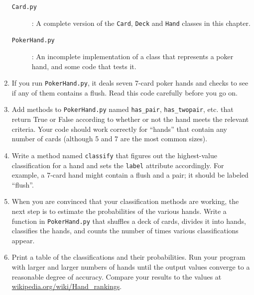 \begin{exercise}
\begin{enumerate}
\begin{description}

\item[{\tt Card.py}]: A complete version of the {\tt Card},
{\tt Deck} and {\tt Hand} classes in this chapter.

\item[{\tt PokerHand.py}]: An incomplete implementation of a class
that represents a poker hand, and some code that tests it.

\end{description}
%
\item If you run {\tt PokerHand.py}, it deals seven 7-card poker hands
and checks to see if any of them contains a flush.  Read this
code carefully before you go on.

\item Add methods to {\tt PokerHand.py} named \verb"has_pair",
\verb"has_twopair", etc. that return True or False according to
whether or not the hand meets the relevant criteria.  Your code should
work correctly for ``hands'' that contain any number of cards
(although 5 and 7 are the most common sizes).

\item Write a method named {\tt classify} that figures out
the highest-value classification for a hand and sets the
{\tt label} attribute accordingly.  For example, a 7-card hand
might contain a flush and a pair; it should be labeled ``flush''.

\item When you are convinced that your classification methods are
working, the next step is to estimate the probabilities of the various
hands.  Write a function in {\tt PokerHand.py} that shuffles a deck of
cards, divides it into hands, classifies the hands, and counts the
number of times various classifications appear.

\item Print a table of the classifications and their probabilities.
Run your program with larger and larger numbers of hands until the
output values converge to a reasonable degree of accuracy.  Compare
your results to the values at \url{wikipedia.org/wiki/Hand_rankings}.

\end{enumerate}
\end{exercise}


